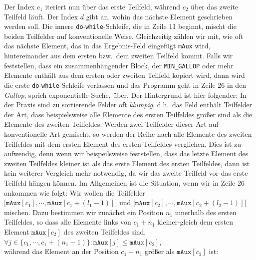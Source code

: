Der Index $c_1$ iteriert nun \"uber das erste Teilfeld, w\"ahrend $c_2$ \"uber das zweite Teilfeld l\"auft.
Der Index $d$ gibt an, wohin das n\"achste Element geschrieben werden soll.  Die innere
\texttt{do}-\texttt{while}-Schleife, die in Zeile 11 beginnt, mischt die beiden Teilfelder auf
konventionelle Weise.  Gleichzeitig z\"ahlen wir mit, wie oft das n\"achste Element, das in das
Ergebnis-Feld eingef\"ugt \texttt{mAux} wird, hintereinander aus dem ersten bzw.~dem zweiten Teilfeld
kommt.   Falls wir feststellen, dass ein zusammenh\"angender Block, der  \texttt{MIN\_GALLOP} oder mehr
Elemente enth\"alt aus dem ersten oder zweiten Teilfeld kopiert wird, dann wird die erste
\texttt{do}-\texttt{while}-Schleife verlassen und das Programm  geht in Zeile 26 in den
\emph{Gallop}, sprich exponentielle Suche, \"uber.  Der Hintergrund ist hier folgender:  In der Praxis
sind zu sortierende Felder oft \emph{klumpig}, d.h.~das Feld enth\"alt Teilfelder der Art, dass
beispielsweise alle Elemente des ersten Teilfeldes gr\"o{\ss}er sind als die Elemente des zweiten
Teilfeldes.  Werden zwei Teilfelder dieser Art auf konventionelle Art gemischt, so werden der Reihe
nach alle Elemente des zweiten Teilfeldes mit dem ersten Element des ersten Teilfeldes verglichen.
Dies ist zu aufwendig, denn wenn wir beispeilsweise feststellen, dass das letzte Element des
zweiten Teilfeldes kleiner ist als das erste Element des ersten Teilfeldes, dann ist kein weiterer
Vergleich mehr notwendig, da wir das zweite Teilfeld vor das erste Teilfeld h\"angen k\"onnen.   Im
Allgemeinen ist die Situation, wenn wir in Zeile 26 ankommen wie folgt: Wir wollen die Teilfelder 
\\[0.2cm]
\hspace*{1.3cm}
$\bigl[ \texttt{mAux}[c_1], \cdots, \texttt{mAux}[c_1 + (l_1 - 1)]\bigr]$ \quad und \quad
$\bigl[ \texttt{mAux}[c_2], \cdots, \texttt{mAux}[c_2 + (l_2 - 1)]\bigr]$ 
\\[0.2cm]
mischen.  Dazu bestimmen wir zun\"achst ein Position $n_1$ innerhalb des ersten Teilfeldes, so dass
alle Elemente links von $c_1 + n_1$ kleiner-gleich dem ersten Element $\mathtt{mAux}[c_2]$ 
des zweiten Teilfeldes sind,
\\[0.2cm]
\hspace*{1.3cm}
$\forall j \in \{ c_1, \cdots, c_1 + (n_1 - 1) \} : \mathtt{mAux}[j] \leq \mathtt{mAux}[c_2]$,
\\[0.2cm]
w\"ahrend das Element an der Position $c_1 + n_1$ gr\"o{\ss}er als $\mathtt{mAux}[c_2]$ ist:
\\[0.2cm]
\hspace*{1.3cm}
